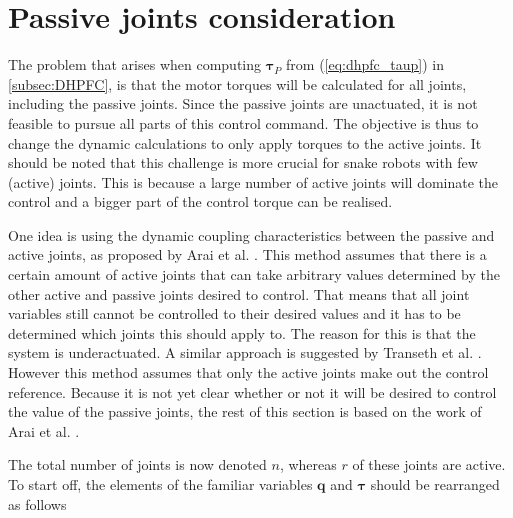 \section{Passive joints consideration}\label{subsec:passive-joints}

The problem that arises when computing $\boldsymbol{\tau}_P$ from (\ref{eq:dhpfc_taup}) in \ref{subsec:DHPFC}, is that the motor torques will be calculated for all joints, including the passive joints. Since the passive joints are unactuated, it is not feasible to pursue all parts of this control command. The objective is thus to change the dynamic calculations to only apply torques to the active joints. It should be noted that this challenge is more crucial for snake robots with few (active) joints. This is because a large number of active joints will dominate the control and a bigger part of the control torque can be realised.

One idea is using the dynamic coupling characteristics between the passive and active joints, as proposed by Arai et al. \cite{arai1991position}. This method assumes that there is a certain amount of active joints that can take arbitrary values determined by the other active and passive joints desired to control. That means that all joint variables still cannot be controlled to their desired values and it has to be determined which joints this should apply to. The reason for this is that the system is underactuated. A similar approach is suggested by Transeth et al. \cite{transeth2007tracking}. However this method assumes that only the active joints make out the control reference. Because it is not yet clear whether or not it will be desired to control the value of the passive joints, the rest of this section is based on the work of Arai et al. \cite{arai1991position}.

The total number of joints is now denoted $n$, whereas $r$ of these joints are active. To start off, the elements of the familiar variables $\mathbf{q}$ and $\boldsymbol{\tau}$ should be rearranged as follows

